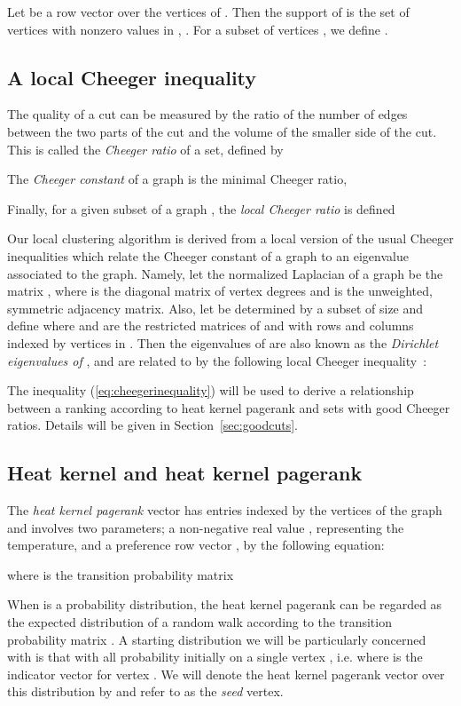 \documentclass[runningheads,a4paper]{llncs}
\begin{document}
Let  be a row vector over the vertices of .  Then the support of
 is the set of vertices with nonzero values in , .  For a subset of vertices , we define .

\subsection{A local Cheeger inequality}
The quality of a cut can be measured by the ratio of the number of edges between
the two parts of the cut and the volume of the smaller side of the cut.  This is
called the \emph{Cheeger ratio} of a set, defined by

The \emph{Cheeger constant} of a graph is the minimal Cheeger ratio,

Finally, for a given subset  of a graph , the \emph{local Cheeger ratio}
is defined


Our local clustering algorithm is derived from a local version of the usual
Cheeger inequalities which relate the Cheeger constant of a graph to an
eigenvalue associated to the graph.  Namely, let the normalized Laplacian of a
graph be the matrix , where  is the diagonal
matrix of vertex degrees and  is the unweighted, symmetric adjacency matrix.
Also, let  be determined by a subset  of size  and define  where  and  are the restricted
matrices of  and  with rows and columns indexed by vertices in .  Then
the eigenvalues  of  are also known as the \emph{Dirichlet eigenvalues of
}, and are related to  by the following local Cheeger
inequality~\cite{chung:partitionhkpr:im09}:


The inequality (\ref{eq:cheegerinequality}) will be used to derive a
relationship between a ranking according to heat kernel pagerank and sets with
good Cheeger ratios.  Details will be given in Section~\ref{sec:goodcuts}.

\subsection{Heat kernel and heat kernel pagerank}
\label{sec:heatkernelandhkpr}
The \emph{heat kernel pagerank} vector has entries indexed by the vertices of
the graph and involves two parameters; a non-negative real value ,
representing the temperature, and a preference row vector ,
by the following equation:

where  is the transition probability matrix


When  is a probability distribution, the heat kernel pagerank can be regarded
as the expected distribution of a random walk according to the transition
probability matrix .  A starting distribution we will be particularly
concerned with is that with all probability initially on a single vertex ,
i.e.  where  is the indicator vector for vertex .  We
will denote the heat kernel pagerank vector over this distribution by  and refer to  as the \emph{seed} vertex.
\end{document}

